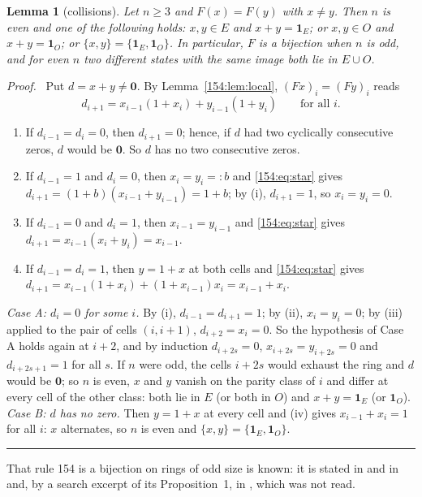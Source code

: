 \documentclass[10pt,a4paper]{article}
\newtheorem{lemma}[theorem]{Lemma}
\newcommand{\qedmark}{\rule{1.1ex}{1.1ex}}
\newenvironment{proof}[1][Proof]{\par\smallskip\noindent\textit{#1.}\ }{\hfill\qedmark\par\smallskip}
\newcommand{\zero}{\mathbf{0}}                %
\newcommand{\one}{\mathbf{1}}                 %
\begin{document}
\begin{lemma}[collisions]\label{154:lem:collisions}
Let $n\ge 3$ and $F(x)=F(y)$ with $x\neq y$. Then $n$ is even and one of the following holds: $x,y\in E$ and
$x+y=\one_E$; or $x,y\in O$ and $x+y=\one_O$; or $\{x,y\}=\{\one_E,\one_O\}$. In particular, $F$ is a bijection when
$n$ is odd, and for even $n$ two different states with the same image both lie in $E\cup O$.
\end{lemma}
\begin{proof}
Put $d=x+y\neq\zero$. By Lemma~\ref{154:lem:local}, $(Fx)_i=(Fy)_i$ reads
\begin{equation}\label{154:eq:star}
d_{i+1}=x_{i-1}(1+x_i)+y_{i-1}(1+y_i)\qquad\text{for all } i .
\end{equation}
\begin{enumerate}[label=\textup{(\roman*)},nosep,leftmargin=2.2em]
\item If $d_{i-1}=d_i=0$, then $d_{i+1}=0$; hence, if $d$ had two cyclically consecutive zeros, $d$ would be
$\zero$. So $d$ has no two consecutive zeros.
\item If $d_{i-1}=1$ and $d_i=0$, then $x_i=y_i=:b$ and \eqref{154:eq:star} gives
$d_{i+1}=(1+b)(x_{i-1}+y_{i-1})=1+b$; by (i), $d_{i+1}=1$, so $x_i=y_i=0$.
\item If $d_{i-1}=0$ and $d_i=1$, then $x_{i-1}=y_{i-1}$ and \eqref{154:eq:star} gives
$d_{i+1}=x_{i-1}(x_i+y_i)=x_{i-1}$.
\item If $d_{i-1}=d_i=1$, then $y=1+x$ at both cells and \eqref{154:eq:star} gives
$d_{i+1}=x_{i-1}(1+x_i)+(1+x_{i-1})x_i=x_{i-1}+x_i$.
\end{enumerate}
\emph{Case A: $d_i=0$ for some $i$.} By (i), $d_{i-1}=d_{i+1}=1$; by (ii), $x_i=y_i=0$; by (iii) applied to the
pair of cells $(i,i+1)$, $d_{i+2}=x_i=0$. So the hypothesis of Case A holds again at $i+2$, and by induction
$d_{i+2s}=0$, $x_{i+2s}=y_{i+2s}=0$ and $d_{i+2s+1}=1$ for all $s$. If $n$ were odd, the cells $i+2s$ would exhaust
the ring and $d$ would be $\zero$; so $n$ is even, $x$ and $y$ vanish on the parity class of $i$ and differ at
every cell of the other class: both lie in $E$ (or both in $O$) and $x+y=\one_E$ (or $\one_O$).
\emph{Case B: $d$ has no zero.} Then $y=1+x$ at every cell and (iv) gives $x_{i-1}+x_i=1$ for all $i$: $x$
alternates, so $n$ is even and $\{x,y\}=\{\one_E,\one_O\}$.
\end{proof}

That rule 154 is a bijection on rings of odd size is known: it is stated in \cite{BhattacharjeeDas2019} and in
\cite{Fedoriaka2025} and, by a search excerpt of its Proposition~1, in \cite{NobeYura2004}, which was not read.
\end{document}
